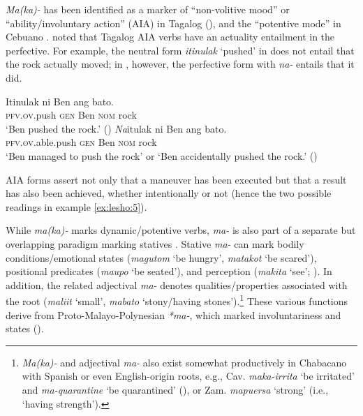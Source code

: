 \documentclass[output=paper,colorlinks,citecolor=brown]{langscibook}
\begin{document}
\textit{Ma(ka)-} has been identified as a marker of “non-volitive mood” \citep{Kroeger1993} or “ability/involuntary action” (AIA) in Tagalog (\citealt{SchachterOtanes1972}), and the “potentive mode” in Cebuano \citep{Rubino2008}. \citet{Dell1983} noted that Tagalog AIA verbs have an actuality entailment in the perfective. For example, the neutral form \textit{itinulak} ‘pushed’ in  does not entail that the rock actually moved; in , however, the perfective form with \textit{na-} entails that it did.

\ea\label{ex:lesho:4}
\gll Itinulak              ni          Ben ang          bato.\\
     \textsc{pfv.ov}.push \textsc{gen} Ben \textsc{nom} rock \\
\glt  `Ben pushed the rock.' (\citealt[179–180]{Dell1983})
\ex\label{ex:lesho:5}
\gll \textit{Na}itulak ni Ben ang bato.\\
       \textsc{pfv.ov}.able.push \textsc{gen} Ben \textsc{nom} rock \\
\glt `Ben managed to push the rock’ or ‘Ben accidentally pushed the rock.' (\citealt[179–180]{Dell1983})\\
\z

AIA forms assert not only that a maneuver has been executed but that a result has also been achieved, whether intentionally or not (hence the two possible readings in example \ref{ex:lesho:5}).

While \textit{ma(ka)-} marks dynamic/potentive verbs, \textit{ma-} is also part of a separate but overlapping paradigm marking statives \citep{Himmelmann2006}. Stative \textit{ma-} can mark bodily conditions/emotional states (\textit{magutom} ‘be hungry’, \textit{matakot} ‘be scared’), positional predicates (\textit{maupo} ‘be seated’), and perception (\textit{makita} ‘see’; \citealt[491–494]{Himmelmann2006}). In addition, the related adjectival \textit{ma-} denotes qualities/properties associated with the root (\textit{maliit} ‘small’, \textit{mabato} ‘stony/having stones’).\footnote{\textit{Ma(ka)-} and adjectival \textit{ma-} also exist somewhat productively in Chabacano with Spanish or even English-origin roots, e.g., Cav. \textit{maka-irrita} ‘be irritated’ and \textit{ma-quarantine} ‘be quarantined' (\citealt[98--105]{Escalante2010}), or Zam. \textit{mapuersa} ‘strong’ (i.e., ‘having strength’).}  These various functions derive from Proto-Malayo-Polynesian \textit{*ma-}, which marked involuntariness and states (\citealt{EvansRoss2001}).
\end{document}
